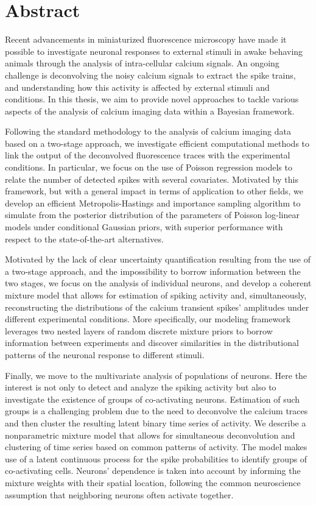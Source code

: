 \chapter*{Abstract} 
Recent advancements in miniaturized fluorescence microscopy have made it possible to investigate neuronal responses to external stimuli in awake behaving animals through the analysis of intra-cellular calcium signals. 
An ongoing challenge is deconvolving the noisy calcium signals to extract the spike trains, and understanding how this activity is affected by external stimuli and conditions.
In this thesis, we aim to provide novel approaches to tackle various aspects of the analysis of calcium imaging data within a Bayesian framework.

Following the standard methodology to the analysis of calcium imaging data based on a two-stage approach, we investigate efficient computational methods to link the output of the deconvolved fluorescence traces with the experimental conditions. In particular, we focus on the use of Poisson regression models to relate the number of detected spikes with several covariates. 
Motivated by this framework, but with a general impact in terms of application to other fields,
we develop an efficient Metropolis-Hastings and importance sampling algorithm to simulate from the posterior distribution of the parameters of Poisson log-linear models under conditional Gaussian priors, with superior performance with respect to the state-of-the-art alternatives. 

Motivated by the lack of clear uncertainty quantification resulting from the use of a two-stage approach, and the impossibility to borrow information between the two stages, we focus on the analysis of individual neurons, and develop a coherent mixture model that allows for estimation of spiking activity and, simultaneously, reconstructing the distributions of the calcium transient spikes' amplitudes under different experimental conditions. More specifically, our modeling framework leverages two nested layers of random discrete mixture priors to borrow information between experiments and discover similarities in the distributional patterns of the neuronal response to different stimuli.

Finally, we move to the multivariate analysis of populations of neurons. Here the interest is not only to detect and analyze the spiking activity but also to investigate the existence of groups of co-activating neurons.
Estimation of such groups is a challenging problem due to the need to deconvolve the calcium traces and then cluster the resulting latent binary time series of activity. We describe a nonparametric mixture model that allows for simultaneous deconvolution and clustering of time series based on common patterns of activity. The model makes use of a latent continuous process for the spike probabilities to identify groups of co-activating cells. Neurons' dependence is taken into account by informing the mixture weights with their spatial location, following the common neuroscience assumption that neighboring neurons often activate together. 

